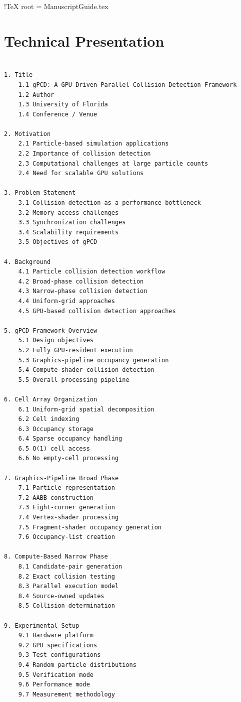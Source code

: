 
!TeX root = ManuscriptGuide.tex
\newpage
\clearpage
\section{Technical Presentation}

\begin{verbatim}

1. Title
    1.1 gPCD: A GPU-Driven Parallel Collision Detection Framework
    1.2 Author
    1.3 University of Florida
    1.4 Conference / Venue

2. Motivation
    2.1 Particle-based simulation applications
    2.2 Importance of collision detection
    2.3 Computational challenges at large particle counts
    2.4 Need for scalable GPU solutions

3. Problem Statement
    3.1 Collision detection as a performance bottleneck
    3.2 Memory-access challenges
    3.3 Synchronization challenges
    3.4 Scalability requirements
    3.5 Objectives of gPCD

4. Background
    4.1 Particle collision detection workflow
    4.2 Broad-phase collision detection
    4.3 Narrow-phase collision detection
    4.4 Uniform-grid approaches
    4.5 GPU-based collision detection approaches

5. gPCD Framework Overview
    5.1 Design objectives
    5.2 Fully GPU-resident execution
    5.3 Graphics-pipeline occupancy generation
    5.4 Compute-shader collision detection
    5.5 Overall processing pipeline

6. Cell Array Organization
    6.1 Uniform-grid spatial decomposition
    6.2 Cell indexing
    6.3 Occupancy storage
    6.4 Sparse occupancy handling
    6.5 O(1) cell access
    6.6 No empty-cell processing

7. Graphics-Pipeline Broad Phase
    7.1 Particle representation
    7.2 AABB construction
    7.3 Eight-corner generation
    7.4 Vertex-shader processing
    7.5 Fragment-shader occupancy generation
    7.6 Occupancy-list creation

8. Compute-Based Narrow Phase
    8.1 Candidate-pair generation
    8.2 Exact collision testing
    8.3 Parallel execution model
    8.4 Source-owned updates
    8.5 Collision determination

9. Experimental Setup
    9.1 Hardware platform
    9.2 GPU specifications
    9.3 Test configurations
    9.4 Random particle distributions
    9.5 Verification mode
    9.6 Performance mode
    9.7 Measurement methodology


\end{verbatim}
